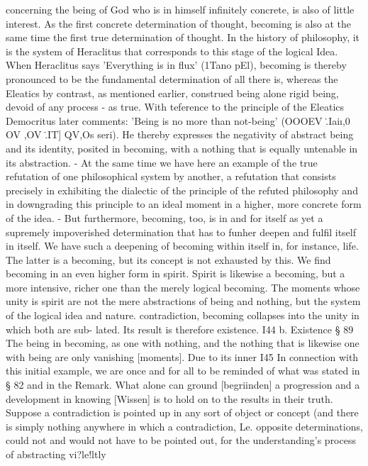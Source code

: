 concerning the being of God who is in himself infinitely concrete, is also of little
interest.
As the first concrete determination of thought, becoming is also at the same time
the first true determination of thought. In the history of philosophy, it is the system
of Heraclitus that corresponds to this stage of the logical Idea. When Heraclitus
says 'Everything is in flux' (1Tano pEl), becoming is thereby pronounced to be
the fundamental determination of all there is, whereas the Eleatics by contrast, as
mentioned earlier, construed being alone rigid being, devoid of any process - as
true. With teference to the principle of the Eleatics Democritus later comments:
'Being is no more than not-being' (OOOEV \..Iai\i\ov ,0 OV ,OV \..IT] QV,Os seri).
He thereby expresses the negativity of abstract being and its identity, posited in
becoming, with a nothing that is equally untenable in its abstraction. - At the
same time we have here an example of the true refutation of one philosophical
system by another, a refutation that consists precisely in exhibiting the dialectic
of the principle of the refuted philosophy and in downgrading this principle to
an ideal moment in a higher, more concrete form of the idea. - But furthermore,
becoming, too, is in and for itself as yet a supremely impoverished determination
that has to funher deepen and fulfil itself in itself. We have such a deepening
of becoming within itself in, for instance, life. The latter is a becoming, but its
concept is not exhausted by this. We find becoming in an even higher form in
spirit. Spirit is likewise a becoming, but a more intensive, richer one than the
merely logical becoming. The moments whose unity is spirit are not the mere
abstractions of being and nothing, but the system of the logical idea and nature. contradiction, becoming collapses into the unity in which both are sub-
lated. Its result is therefore existence.
I44
b. Existence
§ 89
The being in becoming, as one with nothing, and the nothing that is
likewise one with being are only vanishing [moments]. Due to its inner
I45
In connection with this initial example, we are once and for all
to be reminded of what was stated in § 82 and in the Remark. What
alone can ground [begriinden] a progression and a development in
knowing [Wissen] is to hold on to the results in their truth. Suppose
a contradiction is pointed up in any sort of object or concept (and
there is simply nothing anywhere in which a contradiction, Le.
opposite determinations, could not and would not have to be
pointed out, for the understanding's process of abstracting vi?le!ltly
